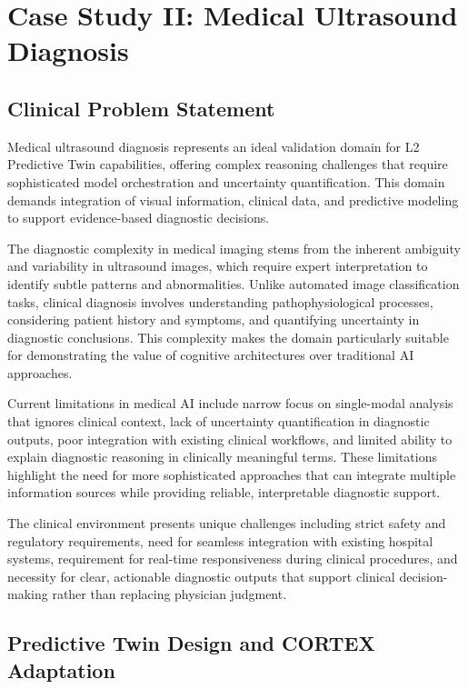 
\chapter{Case Study II: Medical Ultrasound Diagnosis} \label{chp:medical}

\section{Clinical Problem Statement}

Medical ultrasound diagnosis represents an ideal validation domain for L2 Predictive Twin capabilities, offering complex reasoning challenges that require sophisticated model orchestration and uncertainty quantification. This domain demands integration of visual information, clinical data, and predictive modeling to support evidence-based diagnostic decisions.

The diagnostic complexity in medical imaging stems from the inherent ambiguity and variability in ultrasound images, which require expert interpretation to identify subtle patterns and abnormalities. Unlike automated image classification tasks, clinical diagnosis involves understanding pathophysiological processes, considering patient history and symptoms, and quantifying uncertainty in diagnostic conclusions. This complexity makes the domain particularly suitable for demonstrating the value of cognitive architectures over traditional AI approaches.

Current limitations in medical AI include narrow focus on single-modal analysis that ignores clinical context, lack of uncertainty quantification in diagnostic outputs, poor integration with existing clinical workflows, and limited ability to explain diagnostic reasoning in clinically meaningful terms. These limitations highlight the need for more sophisticated approaches that can integrate multiple information sources while providing reliable, interpretable diagnostic support.

The clinical environment presents unique challenges including strict safety and regulatory requirements, need for seamless integration with existing hospital systems, requirement for real-time responsiveness during clinical procedures, and necessity for clear, actionable diagnostic outputs that support clinical decision-making rather than replacing physician judgment.

\section{Predictive Twin Design and CORTEX Adaptation}

